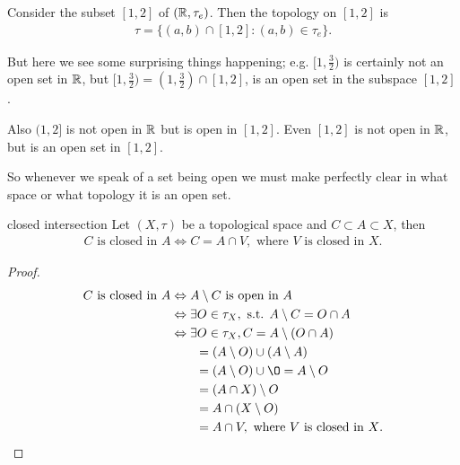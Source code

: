Consider the subset $[1,2]$ of $(\mathbb{R},\tau_e)$. Then the topology on $[1,2]$ is 
\begin{align*}
    \tau = \{(a,b)\cap [1,2]: (a,b)\in \tau_e\}.
\end{align*}
\par
But here we see some surprising things happening; e.g.
$[1,\frac{3}{2})$ is certainly not an open set in $\mathbb{R}$, but $[1,\frac{3}{2})=(1,\frac{3}{2})\cap [1,2]$, is an open set in the subspace $[1,2]$.
\par
Also $(1,2]$ is not open in $\mathbb{R}$ but is open in $[1,2]$. Even $[1,2]$ is not open in $\mathbb{R}$, but is an open set in $[1,2]$.
\par
So whenever we speak of a set being open we must make perfectly clear in what space or what topology it is an open set. 

\begin{proposition}{}{closed intersection}
    Let $(X,\tau)$ be a topological space and $C\subset A\subset X$, then
    \begin{align*}
        C \text{ is closed in } A\Leftrightarrow C = A\cap V, \text{ where $V$ is closed in $X$}.  
    \end{align*}
\end{proposition}
\begin{proof}
         

    \begin{align*}
        C \text{ is closed in } A &\Leftrightarrow A\setminus C \text{ is open in } A\\
         &\Leftrightarrow \exists O\in \tau_{X}, \text{ s.t. } A\setminus C = O\cap A\\
         &\Leftrightarrow \exists O\in \tau_{X}, C= A\setminus(O\cap A) \\
         &\quad\quad = (A\setminus O) \cup (A\setminus A)\\
         &\quad\quad = (A\setminus O) \cup \O = A\setminus O\\
         &\quad\quad = (A\cap X)\setminus O\\
         &\quad\quad = A\cap (X\setminus O)\\
         &\quad\quad = A\cap V, \text{ where $V$ is closed in $X$.}
        \end{align*}
\end{proof}

